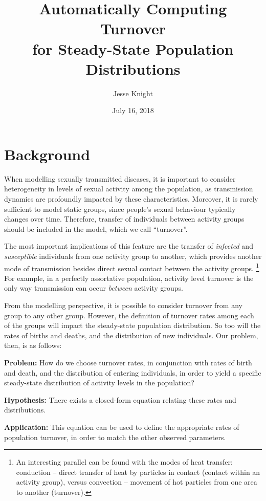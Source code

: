 \documentclass{article}
\title{\vspace{-1.2cm}Automatically Computing Turnover\\for Steady-State Population Distributions}
\author{Jesse Knight}
\date{July 16, 2018}
\begin{document}
\maketitle
\section{Background}
When modelling sexually transmitted diseases, 
it is important to consider heterogeneity in levels of sexual activity among the population,
as transmission dynamics are profoundly impacted by these characteristics.
Moreover, it is rarely sufficient to model static groups,
since people's sexual behaviour typically changes over time.
Therefore, transfer of individuals between activity groups should be included in the model,
which we call ``turnover''.
\par
The most important implications of this feature are the transfer of
\textit{infected} and \textit{susceptible} individuals
from one activity group to another,
which provides another mode of transmission besides
direct sexual contact between the activity groups.%
\footnote{An interesting parallel can be found with the modes of heat transfer:
  conduction -- direct transfer of heat by particles in contact
  (contact within an activity group),
  versus 
  convection -- movement of hot particles from one area to another
  (turnover).}
For example, in a perfectly assortative population,
activity level turnover is the only way transmission can occur \textit{between} activity groups.
\par
From the modelling perspective,
it is possible to consider turnover from any group to any other group.
However, the definition of turnover rates among each of the groups
will impact the steady-state population distribution.
So too will the rates of births and deaths,
and the distribution of new individuals. Our problem, then, is as follows:
\par
\textbf{Problem:} How do we choose turnover rates,
in conjunction with rates of birth and death, and the distribution of entering individuals,
in order to yield a specific steady-state distribution of activity levels in the population?
\par
\textbf{Hypothesis:} There exists a closed-form equation relating these rates and distributions.
\par
\textbf{Application:} This equation can be used to define
the appropriate rates of population turnover,
in order to match the other observed parameters.
\end{document}
